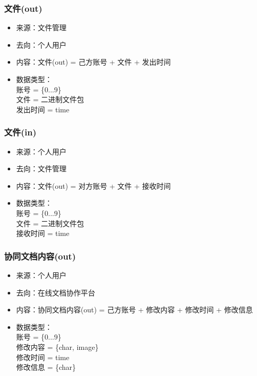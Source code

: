            \subsubsection{文件(out)}
            \begin{itemize}
                \item 来源：文件管理
                \item 去向：个人用户
                \item 内容：文件(out) = 己方账号 + 文件 + 发出时间
                \item 数据类型：\\
                账号 = \{0...9\}\\
                文件 = 二进制文件包\\
                发出时间 = time\\
            \end{itemize}
            \subsubsection{文件(in)}
            \begin{itemize}
                \item 来源：个人用户
                \item 去向：文件管理
                \item 内容：文件(out) = 对方账号 + 文件 + 接收时间
                \item 数据类型：\\
                账号 = \{0...9\}\\
                文件 = 二进制文件包\\
                接收时间 = time\\
            \end{itemize}
            \subsubsection{协同文档内容(out)}
            \begin{itemize}
                \item 来源：个人用户
                \item 去向：在线文档协作平台
                \item 内容：协同文档内容(out) = 己方账号 + 修改内容 + 修改时间 + 修改信息
                \item 数据类型：\\
                账号 = \{0...9\}\\
                修改内容 = \{char, image\}\\
                修改时间 = time\\
                修改信息 = \{char\}\\
            \end{itemize}
